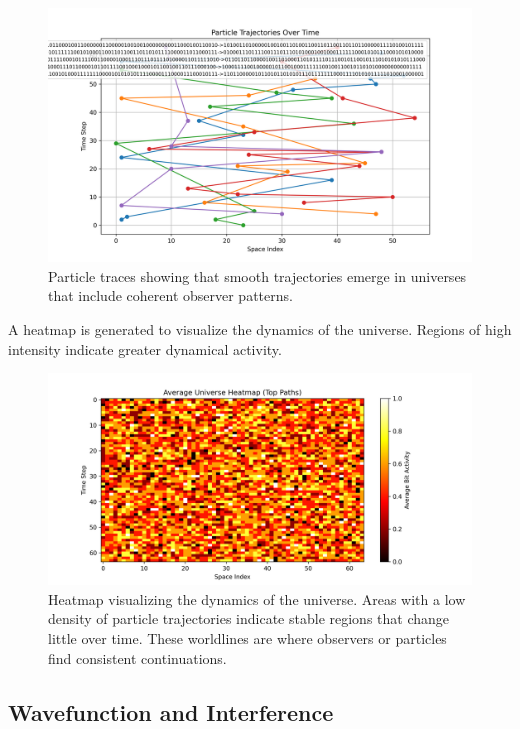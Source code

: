 \documentclass[12pt]{article}
\begin{document}
\begin{figure}[h!]
    \centering
    \includegraphics[width=1.0\textwidth]{figures/particle_trajectories.png}
    \caption{Particle traces showing that smooth trajectories emerge in universes that include coherent observer patterns.}
    \label{fig:particle_trajectories}
\end{figure}

A heatmap is generated to visualize the dynamics of the universe. Regions of high intensity indicate greater dynamical activity.

\begin{figure}[h!]
    \centering
    \includegraphics[width=1.0\textwidth]{figures/average_universe_heatmap.png}
    \caption{Heatmap visualizing the dynamics of the universe. Areas with a low density of particle trajectories indicate stable regions that change little over time. These worldlines are where observers or particles find consistent continuations.}
    \label{fig:average_universe_heatmap}
\end{figure}

\subsection{Wavefunction and Interference}
\end{document}

